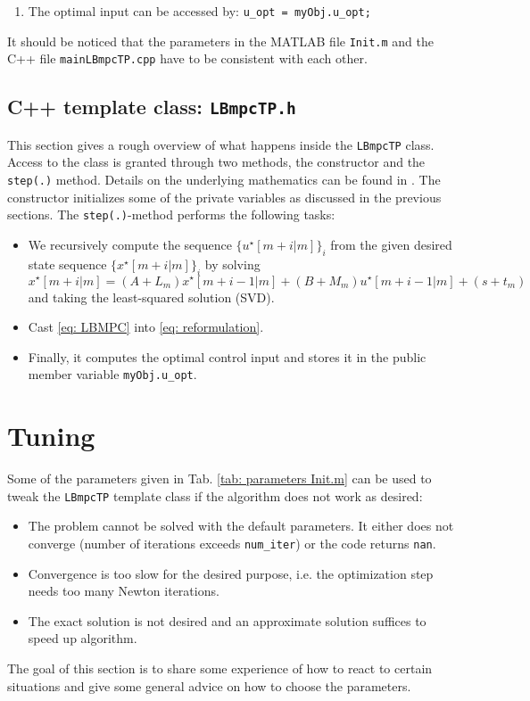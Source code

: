 \documentclass[letter]{article}
\begin{document}
\begin{sffamily}
\begin{enumerate}
	\item The optimal input can be accessed by: \texttt{u\_opt = myObj.u\_opt;}
\end{enumerate}


\noindent
It should be noticed that the parameters in the MATLAB file \texttt{Init.m} and the C++ file \texttt{mainLBmpcTP.cpp} have to be consistent with each other.



\subsection{C++ template class: \texttt{LBmpcTP.h}}
This section gives a rough overview of what happens inside the \texttt{LBmpcTP} class. Access to the class is granted through two methods, the constructor and the \texttt{step(.)} method. Details on the underlying mathematics can be found in \citep{Mehrotra1992PDIPM, Potra2000IPM, Rao98IMP2MPC, Nocedal2000NumOpt}. The constructor initializes some of the private variables as discussed in the previous sections. The \texttt{step(.)}-method performs the following tasks:
\begin{itemize}
	\item We recursively compute the sequence $\{  u^\star[m+i|m]  \}_i$ from the given desired state sequence $\{ x^\star[m+i|m] \}_i$ by solving 
	\begin{equation*}
			x^\star [m+i|m] = (A+L_m)x^\star[m+i-1|m] + (B+M_m)u^\star[m+i-1|m] + (s+t_m)
	\end{equation*}
	and taking the least-squared solution (SVD).
	\item Cast \eqref{eq: LBMPC} into \eqref{eq: reformulation}.
	\item Finally, it computes the optimal control input and stores it in the public member variable \texttt{myObj.u\_opt}.
\end{itemize}


\section{Tuning}
Some of the parameters given in Tab. \ref{tab: parameters Init.m} can be used to tweak the \texttt{LBmpcTP} template class if the algorithm does not work as desired:
\begin{itemize}
	\item The problem cannot be solved with the default parameters. It either does not converge (number of iterations exceeds \texttt{num\_iter}) or the code returns \texttt{nan}.
	\item Convergence is too slow for the desired purpose, i.e. the optimization step needs too many Newton iterations.
	\item The exact solution is not desired and an approximate solution suffices to speed up algorithm.
\end{itemize}
The goal of this section is to share some experience of how to react to certain situations and give some general advice on how to choose the parameters.\\


\end{sffamily}
\end{document}

